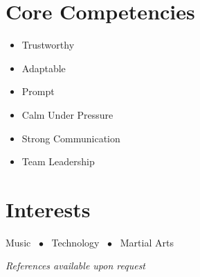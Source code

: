 \documentclass[11pt,a4paper]{article}
\begin{document}
\section*{Core Competencies}

\begin{multicols}{3}
\begin{itemize}[leftmargin=*, itemsep=0pt]
    \item Trustworthy
    \item Adaptable
    \item Prompt
    \item Calm Under Pressure
    \item Strong Communication
    \item Team Leadership
\end{itemize}
\end{multicols}

\section*{Interests}

Music \ $\bullet$ \ Technology \ $\bullet$ \ Martial Arts

\vspace{1em}

\begin{center}
\small{\textit{References available upon request}}
\end{center}
\end{document}
